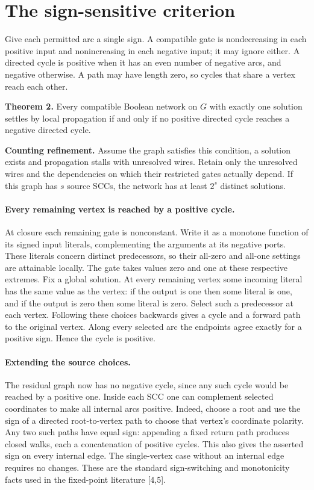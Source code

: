 \documentclass[11pt]{article}
\begin{document}
\section{The sign-sensitive criterion}
Give each permitted arc a single sign. A compatible gate is nondecreasing in each positive input and nonincreasing in each negative input; it may ignore either. A directed cycle is positive when it has an even number of negative arcs, and negative otherwise. A path may have length zero, so cycles that share a vertex reach each other.

\textbf{Theorem 2.} Every compatible Boolean network on $G$ with exactly one solution settles by local propagation if and only if no positive directed cycle reaches a negative directed cycle.

\textbf{Counting refinement.} Assume the graph satisfies this condition, a solution exists and propagation stalls with unresolved wires. Retain only the unresolved wires and the dependencies on which their restricted gates actually depend. If this graph has $s$ source SCCs, the network has at least $2^s$ distinct solutions.

\paragraph{Every remaining vertex is reached by a positive cycle.}
At closure each remaining gate is nonconstant. Write it as a monotone function of its signed input literals, complementing the arguments at its negative ports. These literals concern distinct predecessors, so their all-zero and all-one settings are attainable locally. The gate takes values zero and one at these respective extremes. Fix a global solution. At every remaining vertex some incoming literal has the same value as the vertex: if the output is one then some literal is one, and if the output is zero then some literal is zero. Select such a predecessor at each vertex. Following these choices backwards gives a cycle and a forward path to the original vertex. Along every selected arc the endpoints agree exactly for a positive sign. Hence the cycle is positive.

\paragraph{Extending the source choices.}
The residual graph now has no negative cycle, since any such cycle would be reached by a positive one. Inside each SCC one can complement selected coordinates to make all internal arcs positive. Indeed, choose a root and use the sign of a directed root-to-vertex path to choose that vertex's coordinate polarity. Any two such paths have equal sign: appending a fixed return path produces closed walks, each a concatenation of positive cycles. This also gives the asserted sign on every internal edge. The single-vertex case without an internal edge requires no changes. These are the standard sign-switching and monotonicity facts used in the fixed-point literature [4,5].
\end{document}

